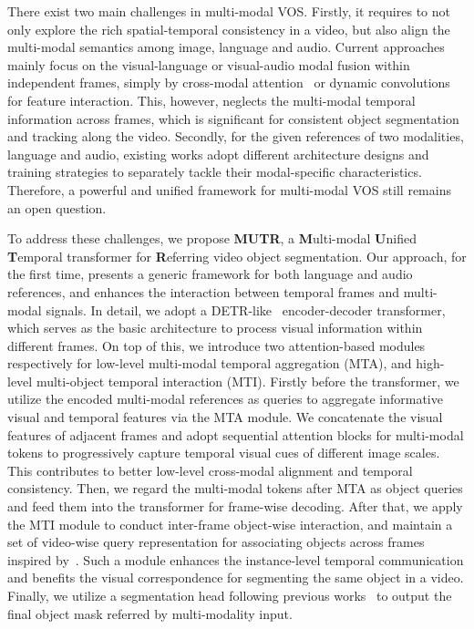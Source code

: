 \documentclass{article}
\begin{document}
There exist two main challenges in multi-modal VOS. Firstly, it requires to not only explore the rich spatial-temporal consistency in a video, but also align the multi-modal semantics among image, language and audio. Current approaches mainly focus on the visual-language or visual-audio modal fusion within independent frames, simply by cross-modal attention~\cite{chen2019see,hu2020bi,shi2018key} or dynamic convolutions~\cite{margffoy2018dynamic} for feature interaction. This, however, neglects the multi-modal temporal information across frames, which is significant for consistent object segmentation and tracking along the video.
Secondly, for the given references of two modalities, language and audio, existing works adopt different architecture designs and training strategies to separately tackle their modal-specific characteristics. Therefore, a powerful and unified framework for multi-modal VOS still remains an open question.


To address these challenges, we propose \textbf{MUTR}, a \textbf{M}ulti-modal \textbf{U}nified \textbf{T}emporal transformer for \textbf{R}eferring video object segmentation. Our approach, for the first time, presents a generic framework for both language and audio references, and enhances the interaction between temporal frames and multi-modal signals. In detail, we adopt a DETR-like~\cite{carion2020end} encoder-decoder transformer, which serves as the basic architecture to process visual information within different frames. On top of this, we introduce two attention-based modules respectively for low-level multi-modal temporal aggregation (MTA), and high-level multi-object temporal interaction (MTI).
Firstly before the transformer, we utilize the encoded multi-modal references as queries to aggregate informative visual and temporal features via the MTA module. We concatenate the visual features of adjacent frames and adopt sequential attention blocks for multi-modal tokens to progressively capture temporal visual cues of different image scales. This contributes to better low-level cross-modal alignment and temporal consistency.
Then, we regard the multi-modal tokens after MTA as object queries and feed them into the transformer for frame-wise decoding.
After that, we apply the MTI module to conduct inter-frame object-wise interaction, and maintain a set of video-wise query representation for associating objects across frames inspired by~\cite{heo2022vita}. Such a module enhances the instance-level temporal communication and benefits the visual correspondence for segmenting the same object in a video. Finally, we utilize a segmentation head following previous works~\cite{wu2022language,wu2021seqformer} to output the final object mask referred by multi-modality input.
\end{document}
